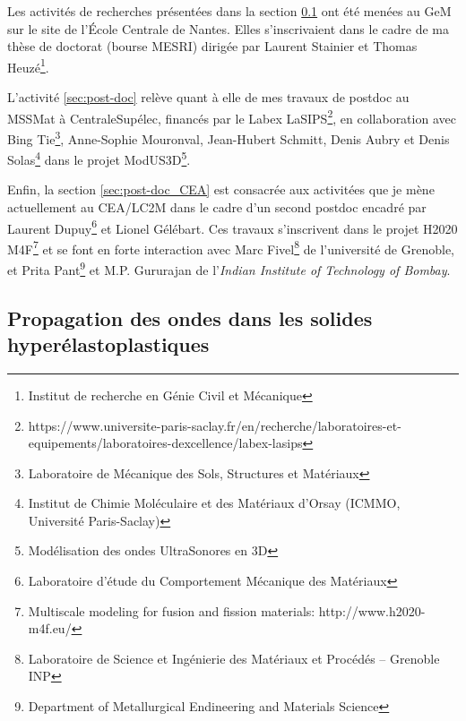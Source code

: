 Les activités de recherches présentées dans la section \ref{sec:doctorat} ont été menées au GeM sur le site de l'{\'E}cole Centrale de Nantes.
Elles s'inscrivaient dans le cadre de ma thèse de doctorat (bourse MESRI) dirigée par Laurent Stainier et Thomas Heuzé\footnote{\label{GeM}Institut de recherche en Génie Civil et Mécanique}.

L'activité \ref{sec:post-doc} relève quant à elle de mes travaux de postdoc au MSSMat à CentraleSupélec, financés par le Labex LaSIPS\footnote{https://www.universite-paris-saclay.fr/en/recherche/laboratoires-et-equipements/laboratoires-dexcellence/labex-lasips}, en collaboration avec Bing Tie\footnote{\label{MSSMat}Laboratoire de Mécanique des Sols, Structures et Matériaux}, Anne-Sophie Mouronval, Jean-Hubert Schmitt, Denis Aubry et Denis Solas\footnote{Institut de Chimie Moléculaire et des Matériaux d'Orsay (ICMMO, Université Paris-Saclay)}  dans le projet ModUS3D\footnote{Modélisation des ondes UltraSonores en 3D}.

Enfin, la section \ref{sec:post-doc_CEA} est consacrée aux activitées que je mène actuellement au CEA/LC2M dans le cadre d'un second postdoc encadré par Laurent Dupuy\footnote{\label{LC2M}Laboratoire d'étude du Comportement Mécanique des Matériaux} et Lionel Gélébart.
Ces travaux s'inscrivent dans le projet H2020 M4F\footnote{Multiscale modeling for fusion and fission materials: http://www.h2020-m4f.eu/} et se font en forte interaction avec Marc Fivel\footnote{\label{SIMap}Laboratoire de Science et Ingénierie des Matériaux et Procédés -- Grenoble INP} de l'université de Grenoble, et  Prita Pant\footnote{\label{ITT}Department of Metallurgical Endineering and Materials Science} et M.P. Gururajan de l'\textit{Indian Institute of Technology of Bombay}.


%   


\begin{refsection}
  \subsection{Propagation des ondes dans les solides hyperélastoplastiques}
  \label{sec:doctorat}
  
  \printbibliography[heading=subbibliography]
\end{refsection}

